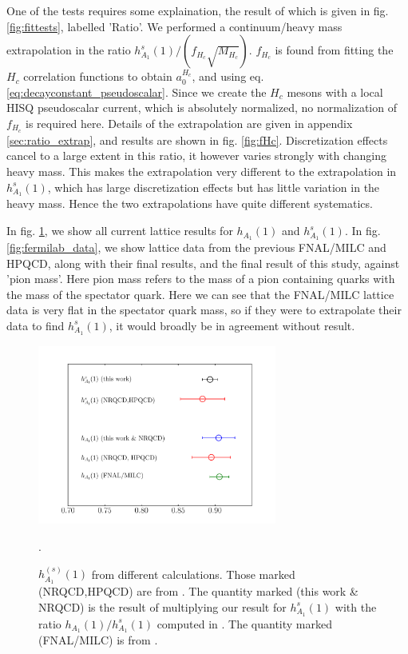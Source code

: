 One of the tests requires some explaination, the result of which is given in fig. \ref{fig:fittests}, labelled 'Ratio'. We performed a continuum/heavy mass extrapolation in the ratio $h_{A_1}^s(1)/(f_{H_c}\sqrt{M_{H_c}})$. $f_{H_c}$ is found from fitting the $H_c$ correlation functions to obtain $a_0^{H_c}$, and using eq. \eqref{eq:decayconstant_pseudoscalar}. Since we create the $H_c$ mesons with a local HISQ pseudoscalar current, which is absolutely normalized, no normalization of $f_{H_c}$ is required here. Details of the extrapolation are given in appendix \ref{sec:ratio_extrap}, and results are shown in fig. \ref{fig:fHc}. Discretization effects cancel to a large extent in this ratio, it however varies strongly with changing heavy mass. This makes the extrapolation very different to the extrapolation in $h_{A_1}^s(1)$, which has large discretization effects but has little variation in the heavy mass. Hence the two extrapolations have quite different systematics.

In fig. \ref{fig:comparison}, we show all current lattice results for $h_{A_1}(1)$ and $h_{A_1}^s(1)$. In fig. \ref{fig:fermilab_data}, we show lattice data from the previous FNAL/MILC and HPQCD, along with their final results, and the final result of this study, against 'pion mass'. Here pion mass refers to the mass of a pion containing quarks with the mass of the spectator quark. Here we can see that the FNAL/MILC lattice data is very flat in the spectator quark mass, so if they were to extrapolate their data to find $h^s_{A_1}(1)$, it would broadly be in agreement without result.

\begin{figure}[htb!]
  \begin{center}
  \hspace{-20pt}
  \includegraphics[width=0.7\textwidth]{images/BsDsstar/comparisons.pdf}
  \caption{ $h_{A_1}^{(s)}(1)$ from different calculations. Those marked (NRQCD,HPQCD) are from \cite{Harrison:2017fmw}. The quantity marked (this work \& NRQCD) is the result of multiplying our result for $h^s_{A_1}(1)$ with the ratio $h_{A_1}(1)/h^s_{A_1}(1)$ computed in \cite{Harrison:2017fmw}. The quantity marked (FNAL/MILC) is from \cite{Bailey:2014tva}. \label{fig:comparison}}.
  \end{center}
\end{figure}


